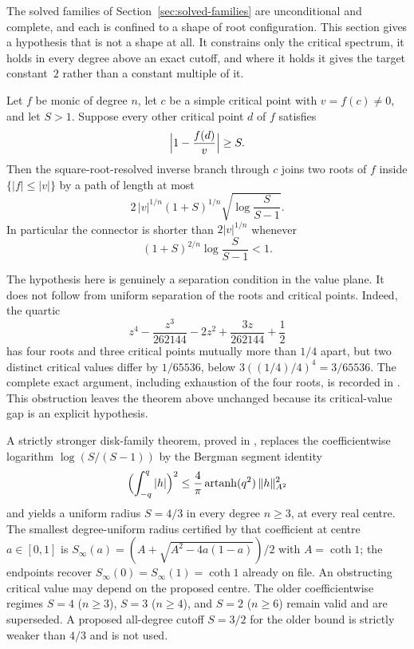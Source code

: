 \documentclass[11pt]{article}
\begin{document}
The solved families of Section~\ref{sec:solved-families} are unconditional and
complete, and each is confined to a shape of root configuration.  This section
gives a hypothesis that is not a shape at all.  It constrains only the critical
spectrum, it holds in every degree above an exact cutoff, and where it holds it
gives the target constant~$2$ rather than a constant multiple of it.

\begin{theorem}\label{res:critical-value-separation}
Let $f$ be monic of degree $n$, let $c$ be a simple critical point with
$v=f(c)\ne0$, and let $S>1$.  Suppose every other critical point $d$ of $f$
satisfies
\[
  \Bigl|1-\frac{f(d)}{v}\Bigr|\ge S .
\]
Then the square-root-resolved inverse branch through $c$ joins two roots of
$f$ inside $\{|f|\le|v|\}$ by a path of length at most
\[
  2\,|v|^{1/n}(1+S)^{1/n}\sqrt{\log\frac{S}{S-1}} .
\]
In particular the connector is shorter than $2|v|^{1/n}$ whenever
\begin{equation}\label{eq:separation-threshold}
  (1+S)^{2/n}\log\frac{S}{S-1}<1 .
\end{equation}
\end{theorem}

The hypothesis here is genuinely a separation condition in the value plane.
It does not follow from uniform separation of the roots and critical points.
Indeed, the quartic
\[
 z^4-\frac{z^3}{262144}-2z^2+\frac{3z}{262144}+\frac12
\]
has four roots and three critical points mutually more than $1/4$ apart, but
two distinct critical values differ by $1/65536$, below
$3((1/4)/4)^4=3/65536$.  The complete exact argument, including exhaustion
of the four roots, is recorded in
.
This obstruction leaves the theorem above unchanged because its
critical-value gap is an explicit hypothesis.

\begin{corollary}\label{res:critical-value-thresholds}
A strictly stronger disk-family theorem, proved in
, replaces
the coefficientwise logarithm $\log(S/(S-1))$ by the Bergman segment identity
\[
 \Bigl(\int_{-q}^{q}|h|\Bigr)^2
 \le\frac4\pi\operatorname{artanh}(q^2)\,\|h\|_{A^2}^2
\]
and yields a uniform radius $S=4/3$ in every degree $n\ge3$, at every real
centre.  The smallest degree-uniform radius certified by that coefficient at
centre $a\in[0,1]$ is
$S_\infty(a)=(A+\sqrt{A^2-4a(1-a)})/2$ with $A=\coth 1$; the endpoints recover $S_\infty(0)=S_\infty(1)=\coth1$ already on file.
An obstructing critical value may depend on the proposed centre.  The older
coefficientwise regimes $S=4$ ($n\ge3$), $S=3$ ($n\ge4$), and $S=2$ ($n\ge6$)
remain valid and are superseded.  A proposed all-degree cutoff $S=3/2$ for
the older bound is strictly weaker than $4/3$ and is not used.
\end{corollary}
\end{document}
